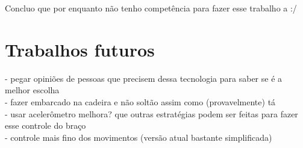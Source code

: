 Concluo que por enquanto não tenho competência para fazer esse trabalho a :/

\section{Trabalhos futuros}
- pegar opiniões de pessoas que precisem dessa tecnologia para saber se é a melhor escolha
\\- fazer embarcado na cadeira e não soltão assim como (provavelmente) tá
\\- usar acelerômetro melhora? que outras estratégias podem ser feitas para fazer esse controle do braço
\\- controle mais fino dos movimentos (versão atual bastante simplificada)